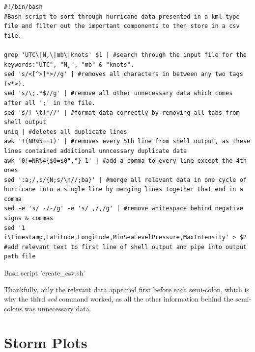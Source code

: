 \documentclass[]{article}
\begin{document}
\begin{listing}[h!]
    \begin{verbatim}
#!/bin/bash
#Bash script to sort through hurricane data presented in a kml type file and filter out the important components to then store in a csv file.

grep 'UTC\|N,\|mb\|knots' $1 | #search through the input file for the keywords:"UTC", "N,", "mb" & "knots".
sed 's/<[^>]*>//g' | #removes all characters in between any two tags (<*>).
sed 's/\;.*$//g' | #remove all other unnecessary data which comes after all ';' in the file.
sed 's/[ \t]*//' | #format data correctly by removing all tabs from shell output
uniq | #deletes all duplicate lines
awk '!(NR%5==1)' | #removes every 5th line from shell output, as these lines contained additional unncessary duplicate data 
awk '0!=NR%4{$0=$0","} 1' | #add a comma to every line except the 4th ones
sed ':a;/,$/{N;s/\n//;ba}' | #merge all relevant data in one cycle of hurricane into a single line by merging lines together that end in a comma
sed -e 's/ -/-/g' -e 's/ ,/,/g' | #remove whitespace behind negative signs & commas
sed '1 i\Timestamp,Latitude,Longitude,MinSeaLevelPressure,MaxIntensity' > $2 #add relevant text to first line of shell output and pipe into output path file

    \end{verbatim}
    \caption{Bash script 'create\_csv.sh'}
    \label{lst:hello}
\end{listing}

Thankfully, only the relevant data appeared first before each semi-colon, which is why the third \emph{sed} command worked, as all the other information behind the semi-colons was unnecessary data.

\section{Storm Plots}
\end{document}
